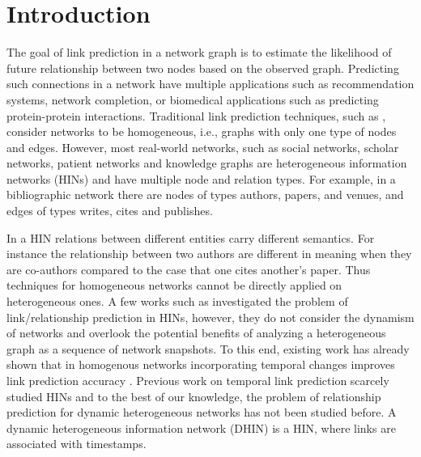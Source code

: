 \section{Introduction}
\label{Sec:Introduction}


The goal of link prediction in a network graph \cite{liben2007link} is to estimate the likelihood of future relationship between two nodes based on the observed graph. Predicting such connections in a network have multiple applications such as recommendation systems, network completion, or biomedical applications such as predicting protein-protein interactions. Traditional link prediction techniques, such as \cite{liben2007link}, consider networks to be homogeneous, i.e., graphs with only one type of nodes and edges. However, most real-world networks, such as social networks, scholar networks, patient networks \cite{denny2012mining} and knowledge graphs \cite{wang2015incorporating} are heterogeneous information networks (HINs) \cite{shi2017survey} and have multiple node and relation types. For example, in a bibliographic network there are nodes of types authors, papers, and venues, and edges of types writes, cites and publishes.%

In a HIN relations between different entities carry different semantics. For instance the relationship between two authors are different in meaning when they are co-authors compared to the case that one cites another's paper. Thus techniques for homogeneous networks cannot be directly applied on heterogeneous ones. A few works such as \cite{sun2011pathsim,sun2011ASONAM} investigated the problem of link/relationship prediction in HINs, however, they do not consider the dynamism of networks and overlook the potential benefits of analyzing a heterogeneous graph as a sequence of network snapshots. To this end, existing work has already shown that in homogenous networks incorporating temporal changes improves link prediction accuracy \cite{Zhu2016}. Previous work on temporal link prediction scarcely studied HINs and to the best of our knowledge, the problem of relationship prediction for dynamic heterogeneous networks has not been studied before. A dynamic heterogeneous information network (DHIN) is a HIN, where links are associated with timestamps.

